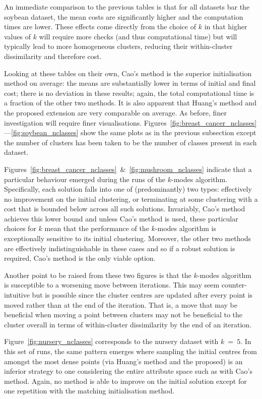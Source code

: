 An immediate comparison to the previous tables is that for all datasets bar the
soybean dataset, the mean costs are significantly higher and the computation
times are lower. These effects come directly from the choice of \(k\) in that
higher values of \(k\) will require more checks (and thus computational time)
but will typically lead to more homogeneous clusters, reducing their
within-cluster dissimilarity and therefore cost.

Looking at these tables on their own, Cao's method is the superior
initialisation method on average: the means are substantially lower in terms of
initial and final cost; there is no deviation in these results; again, the total
computational time is a fraction of the other two methods. It is also apparent
that Huang's method and the proposed extension are very comparable on average.
As before, finer investigation will require finer visualisations.
Figures~\ref{fig:breast_cancer_nclasses}---\ref{fig:soybean_nclasses} show the
same plots as in the previous subsection except the number of clusters has been
taken to be the number of classes present in each dataset.

Figures~\ref{fig:breast_cancer_nclasses}~\&~\ref{fig:mushroom_nclasses} indicate
that a particular behaviour emerged during the runs of the \(k\)-modes
algorithm. Specifically, each solution falls into one of (predominantly) two
types: effectively no improvement on the initial clustering, or terminating at
some clustering with a cost that is bounded below across all such solutions.
Invariably, Cao's method achieves this lower bound and unless Cao's method is
used, these particular choices for \(k\) mean that the performance of the
\(k\)-modes algorithm is exceptionally sensitive to its initial clustering.
Moreover, the other two methods are effectively indistinguishable in these
cases and so if a robust solution is required, Cao's method is the only viable
option.

Another point to be raised from these two figures is that the \(k\)-modes
algorithm is susceptible to a worsening move between iterations. This may seem
counter-intuitive but is possible since the cluster centres are updated after
every point is moved rather than at the end of the iteration. That is, a move
that may be beneficial when moving a point between clusters may not be
beneficial to the cluster overall in terms of within-cluster dissimilarity by
the end of an iteration.

Figure~\ref{fig:nursery_nclasses} corresponds to the nursery dataset with
\(k~=~5\). In this set of runs, the same pattern emerges where sampling the
initial centres from amongst the most dense points (via Huang's method and the
proposed) is an inferior strategy to one considering the entire attribute space
such as with Cao's method. Again, no method is able to improve on the initial
solution except for one repetition with the matching initialisation method.

